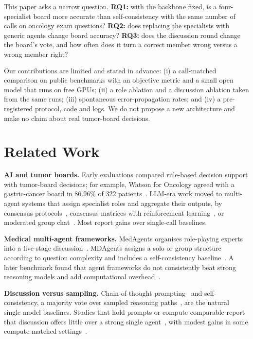 \IfFileExists{IEEEtran.cls}{\documentclass[conference]{IEEEtran}}{\documentclass[10pt,twocolumn]{article}\usepackage[margin=0.75in]{geometry}}
\begin{document}
This paper asks a narrow question. \textbf{RQ1:} with the backbone fixed, is a four-specialist board more accurate than self-consistency with the same number of calls on oncology exam questions? \textbf{RQ2:} does replacing the specialists with generic agents change board accuracy? \textbf{RQ3:} does the discussion round change the board's vote, and how often does it turn a correct member wrong versus a wrong member right?

Our contributions are limited and stated in advance: (i) a call-matched comparison on public benchmarks with an objective metric and a small open model that runs on free GPUs; (ii) a role ablation and a discussion ablation taken from the same runs; (iii) spontaneous error-propagation rates; and (iv) a pre-registered protocol, code and logs. We do not propose a new architecture and make no claim about real tumor-board decisions.

\section{Related Work}
\textbf{AI and tumor boards.} Early evaluations compared rule-based decision support with tumor-board decisions; for example, Watson for Oncology agreed with a gastric-cancer board in 86.96\% of 322 patients~\cite{park2024fidelity}. LLM-era work moved to multi-agent systems that assign specialist roles and aggregate their outputs, by consensus protocols~\cite{liu2025evomdt}, consensus matrices with reinforcement learning~\cite{han2025consensus}, or moderated group chat~\cite{kim2025mlhc}. Most report gains over single-call baselines.

\textbf{Medical multi-agent frameworks.} MedAgents organises role-playing experts into a five-stage discussion~\cite{tang2024medagents}. MDAgents assigns a solo or group structure according to question complexity and includes a self-consistency baseline~\cite{kim2024mdagents}. A later benchmark found that agent frameworks do not consistently beat strong reasoning models and add computational overhead~\cite{shao2025medagentsbench}.

\textbf{Discussion versus sampling.} Chain-of-thought prompting~\cite{wei2022cot,kojima2022zeroshot} and self-consistency, a majority vote over sampled reasoning paths~\cite{wang2023selfconsistency}, are the natural single-model baselines. Studies that hold prompts or compute comparable report that discussion offers little over a strong single agent~\cite{wang2024rethinking,smit2023mad}, with modest gains in some compute-matched settings~\cite{wunderlich2026pareto}.
\end{document}
